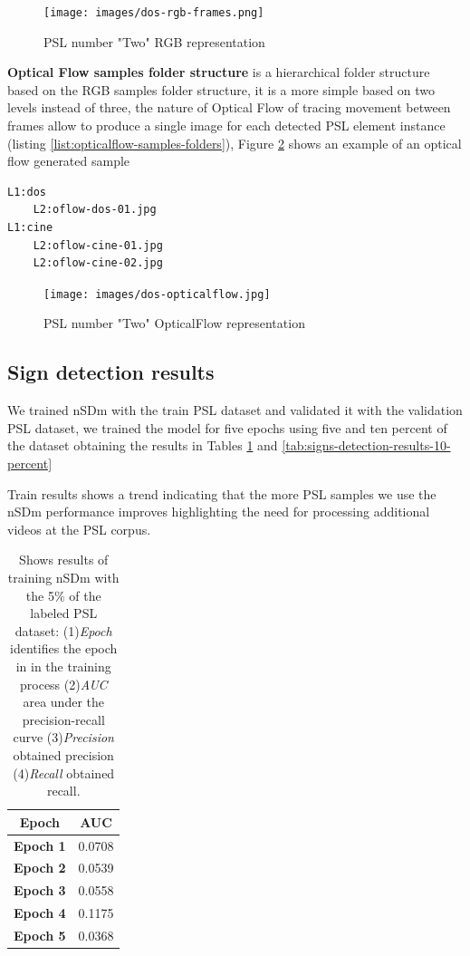 \documentclass[twocolumn,conference]{article}
\begin{document}
\begin{figure}[hbt!]
\texttt{[image: images/dos-rgb-frames.png]}
\caption{PSL number "Two" RGB representation}
\label{fig:rgb-two}
\end{figure}

\textbf{Optical Flow samples folder structure} is a hierarchical folder structure based on the RGB samples folder structure, it is a more simple based on two levels instead of three, the nature of Optical Flow of tracing movement between frames allow to produce a single image for each detected PSL element instance (listing \ref{list:opticalflow-samples-folders}), Figure \ref{fig:opticalflow-two} shows an example of an optical flow generated sample
\begin{lstlisting}[caption=Optical Flow Samples Folder Structure example, basicstyle=\ttfamily\small]
L1:dos
	L2:oflow-dos-01.jpg
L1:cine
	L2:oflow-cine-01.jpg
	L2:oflow-cine-02.jpg
\end{lstlisting}\label{list:opticalflow-samples-folders}
\begin{figure}[hbt!]
\texttt{[image: images/dos-opticalflow.jpg]}
\caption{PSL number "Two" OpticalFlow representation}
\label{fig:opticalflow-two}
\end{figure}

\subsection{Sign detection results}
We trained nSDm with the train PSL dataset and validated it with the validation PSL dataset, we trained the model  for five epochs using five and ten percent of the dataset obtaining the results in Tables \ref{tab:signs-detection-results-5-percent} and \ref{tab:signs-detection-results-10-percent}

Train results shows a trend indicating that the more PSL samples we use the nSDm performance improves highlighting the need for processing additional videos at the PSL corpus.
\begin{table}[!htb]
\captionsetup{font=footnotesize}
\centering
\begin{tabular}{ p{16em} c }
\toprule
\multicolumn{1}{c}{\textbf{Epoch}} & 
	\multicolumn{1}{c}{\textbf{AUC}}\\
\midrule
\textbf{Epoch 1}&	0.0708\\
\textbf{Epoch 2}&	0.0539\\
\textbf{Epoch 3}&	0.0558\\
\textbf{Epoch 4}&	0.1175\\
\textbf{Epoch 5}&	0.0368\\
\bottomrule
\end{tabular}
\caption{Shows results of training nSDm with the 5\% of the labeled PSL dataset: (1)\textit{Epoch} identifies the epoch in in the training process (2)\textit{AUC} area under the precision-recall curve (3)\textit{Precision} obtained precision (4)\textit{Recall} obtained recall.}
\label{tab:signs-detection-results-5-percent}
\end{table}
\end{document}
